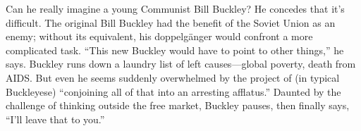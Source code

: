  \par 
Can he really imagine a young Communist Bill Buckley? He concedes that it’s difficult. The original Bill Buckley had the benefit of the Soviet Union as an enemy; without its equivalent, his doppelgänger would confront a more complicated task. “This new Buckley would have to point to other things,” he says. Buckley runs down a laundry list of left causes—global poverty, death from AIDS. But even he seems suddenly overwhelmed by the project of (in typical Buckleyese) “conjoining all of that into an arresting afflatus.” Daunted by the challenge of thinking outside the free market, Buckley pauses, then finally says, “I’ll leave that to you.”